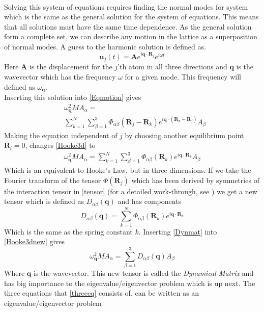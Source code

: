 \begin{align}
\end{align}Solving this system of equations requires finding the normal modes for system which is the same as the general solution for the system of equations. This means that all solutions must have the same time dependence. As the general solution form a complete set, we can describe any motion in the lattice as a superposition of normal modes. A guess to the harmonic solution is defined as.\begin{equation}
    \mathbf{u}_{j}(t)=\mathbf{A}e^{i\mathbf{q}\cdot\mathbf{R}_{j}}e^{i\omega t}
\end{equation}Here $\mathbf{A}$ is the displacement for the $j$'th atom in all three directions and $\mathbf{q}$ is the wavevector which has the frequency $\omega$ for a given mode. This frequency will defined as $\omega_{\mathbf{q}}$.\\ Inserting this solution into \cref{Eqmotion} gives\begin{align}
&\omega_{\mathbf{q}}^{2}MA_{\alpha}=\nonumber\\
&\sum_{k=1}^{N}\sum_{\beta=1}^{3}\Phi_{\alpha\beta}(\mathbf{R}_{j}-\mathbf{R}_{k})e^{i\mathbf{q}\cdot(\mathbf{R}_{k}-\mathbf{R}_{j})}A_{\beta}\label{Hooke3d}
\end{align} Making the equation independent of $j$ by choosing another equilibrium point $\mathbf{R}_{l}=0$, changes \cref{Hooke3d} to\begin{align} \omega_{\mathbf{q}}^{2}MA_{\alpha}=\sum_{k=1}^{N}\sum_{\beta=1}^{3}\Phi_{\alpha\beta}(\mathbf{R}_{k})e^{i\mathbf{q}\cdot\mathbf{R}_{k}}A_{\beta}\label{Hooke3dnew}
\end{align}Which is an equivalent to Hooke's Law, but in three dimensions. If we take the Fourier transform of the tensor $\Phi(\mathbf{R}_{j})$ which has been derived by symmetries of the interaction tensor in \cref{tensor} (for a detailed work-through, see ) we get a new tensor which is defined as $D_{\alpha\beta}(\mathbf{q})$ and has components\begin{equation}
    D_{\alpha\beta}(\mathbf{q})=\sum_{k=1}^{N}\Phi_{\alpha\beta}(\mathbf{R}_{k})e^{i\mathbf{q}\cdot\mathbf{R}_{k}}\label{Dynmat}
\end{equation} Which is the same as the spring constant $k$. Inserting \cref{Dynmat} into \cref{Hooke3dnew} gives\begin{equation}
    \omega_{\mathbf{q}}^{2}MA_{\alpha}=\sum_{\beta=1}^{3}D_{\alpha\beta}(\mathbf{q})A_{\beta}\label{threeeq}
\end{equation}Where $\mathbf{q}$ is the wavevector. This new tensor is called the \textit{Dynamical Matrix} and has big importance to the eigenvalue/eigenvector problem which is up next. The three equations that \cref{threeeq} consists of, can be written as an eigenvalue/eigenvector problem\begin{equation}

\end{equation}
